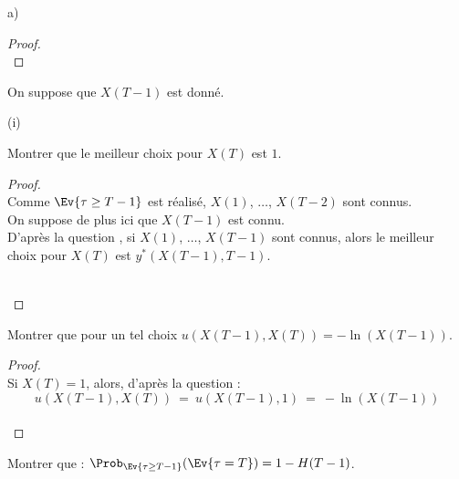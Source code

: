 \documentclass[11pt]{article}%
\begin{document}
\begin{noliste}{a)}
\begin{proof}
      ~\\[-.8cm]
    \end{proof}
    
    \item On suppose que $X(T-1)$ est donné.
    \begin{nonoliste}{(i)}
      \item Montrer que le meilleur choix pour $X(T)$ est $1$.
      
      \begin{proof}~\\
        Comme $\Ev{\tau \geq T-1}$ est réalisé, $X(1)$, $\ldots$, 
        $X(T-2)$ sont connus.\\
        On suppose de plus ici que $X(T-1)$ est connu.\\
        D'après la question , si $X(1)$, $\ldots$, $X(T-1)$
        sont connus, alors le meilleur choix pour $X(T)$ est 
        $y^*(X(T-1),T-1)$.
        
        ~\\[-1.4cm]
      \end{proof}

      
      \item Montrer que pour un tel choix $u(X(T-1), X(T)) = 
      - \ln (X(T-1))$.
      
      \begin{proof}~\\
        Si $X(T)=1$, alors, d'après la question  :
        \[
          u(X(T-1),X(T)) \ = \ u(X(T-1),1) \ = \ -\ln(X(T-1))
        \]
        ~\\[-1cm]
      \end{proof}
    \end{nonoliste}
    
    
    
    
    \item Montrer que : $\Prob_{\Ev{\tau \geq T-1}}(\Ev{\tau = T})
    =1- H(T-1)$.
    

\end{noliste}
\end{document}
